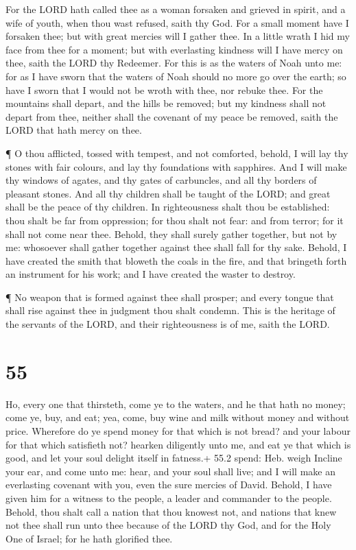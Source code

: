  For the LORD hath called thee as a woman forsaken and
grieved in spirit, and a wife of youth, when thou wast refused, saith
thy God.  For a small moment have I forsaken thee; but with
great mercies will I gather thee.  In a little wrath I hid
my face from thee for a moment; but with everlasting kindness will I
have mercy on thee, saith the LORD thy Redeemer.  For this
is as the waters of Noah unto me: for as I have sworn that the waters of
Noah should no more go over the earth; so have I sworn that I would not
be wroth with thee, nor rebuke thee.  For the mountains
shall depart, and the hills be removed; but my kindness shall not depart
from thee, neither shall the covenant of my peace be removed, saith the
LORD that hath mercy on thee.

 ¶ O thou afflicted, tossed with tempest, and not
comforted, behold, I will lay thy stones with fair colours, and lay thy
foundations with sapphires.  And I will make thy windows of
agates, and thy gates of carbuncles, and all thy borders of pleasant
stones.  And all thy children shall be taught of the LORD;
and great shall be the peace of thy children.  In
righteousness shalt thou be established: thou shalt be far from
oppression; for thou shalt not fear: and from terror; for it shall not
come near thee.  Behold, they shall surely gather together,
but not by me: whosoever shall gather together against thee shall fall
for thy sake.  Behold, I have created the smith that
bloweth the coals in the fire, and that bringeth forth an instrument for
his work; and I have created the waster to destroy.

 ¶ No weapon that is formed against thee shall prosper; and
every tongue that shall rise against thee in judgment thou shalt
condemn. This is the heritage of the servants of the LORD, and their
righteousness is of me, saith the LORD.

\hypertarget{section-54}{%
\section{55}\label{section-54}}

 Ho, every one that thirsteth, come ye to the waters, and he
that hath no money; come ye, buy, and eat; yea, come, buy wine and milk
without money and without price.  Wherefore do ye spend
money for that which is not bread? and your labour for that which
satisfieth not? hearken diligently unto me, and eat ye that which is
good, and let your soul delight itself in fatness.+ 55.2 spend: Heb.
weigh  Incline your ear, and come unto me: hear, and your
soul shall live; and I will make an everlasting covenant with you, even
the sure mercies of David.  Behold, I have given him for a
witness to the people, a leader and commander to the people.
 Behold, thou shalt call a nation that thou knowest not, and
nations that knew not thee shall run unto thee because of the LORD thy
God, and for the Holy One of Israel; for he hath glorified thee.

